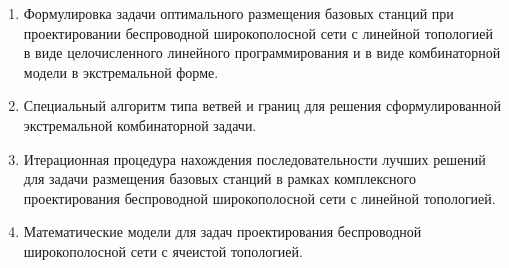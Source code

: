 \begin{enumerate}[beginpenalty=10000] %
    \item Формулировка задачи оптимального размещения базовых станций при проектировании беспроводной широкополосной сети с линейной топологией в виде целочисленного линейного программирования и в виде комбинаторной модели в экстремальной форме.
   
    \item Специальный алгоритм типа ветвей и границ для решения сформулированной экстремальной комбинаторной задачи.
    \item Итерационная процедура нахождения последовательности лучших решений для задачи размещения базовых станций в рамках комплексного проектирования беспроводной широкополосной сети с линейной топологией.
    \item Математические модели для задач проектирования беспроводной широкополосной сети с ячеистой
    топологией.
  \end{enumerate}




